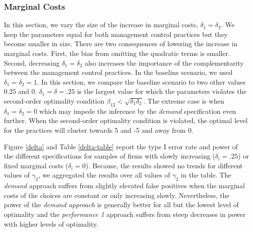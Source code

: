 \documentclass[12pt]{article}
\begin{document}
\subsubsection{Marginal Costs}\label{marginal-cost}
 
In this section, we vary the size of the increase in marginal costs, $\delta_1 = \delta_2$. We keep the parameters equal for both management control practices but they become smaller in size. There are two consequences of lowering the increase in marginal costs. First, the bias from omitting the quadratic terms is smaller. Second, decreasing $\delta_1 = \delta_2$ also increases the importance of the complementarity between the management control practices.  In the baseline scenario, we used $\delta_1 = \delta_2 = 1$. In this section, we compare the baseline scenario to two other values $0.25$ and $0$. $\delta_1 = \delta = .25$ is the largest value for which the parameters violates the second-order optimality condition $\beta_{12} < \sqrt{\delta_1 \delta_2}$. The extreme case is when $\delta_1 = \delta_2 = 0$ which may impede the inference by the \emph{demand} specification even further. When the second-order optimality condition is violated, the optimal level for the practices will cluster towards 5 and -5 and away from  0. 

Figure \ref{delta} and Table \ref{delta-table} report the type I error rate and power of the different specifications for samples of firms with slowly increasing ($\delta_i = .25$) or fixed marginal costs ($\delta_i = 0$). Because, the results showed no trends for different values of $\gamma_2$, we aggregated the results over all values of $\gamma_2$ in the table. The \emph{demand} approach suffers from slightly elevated false positives when the marginal costs of the choices are constant or only increasing slowly. Nevertheless, the power of the \emph{demand approach} is generally better for all but the lowest level of optimality and the \emph{performance 1} approach suffers from steep decreases in power with higher levels of optimality.
\end{document}
